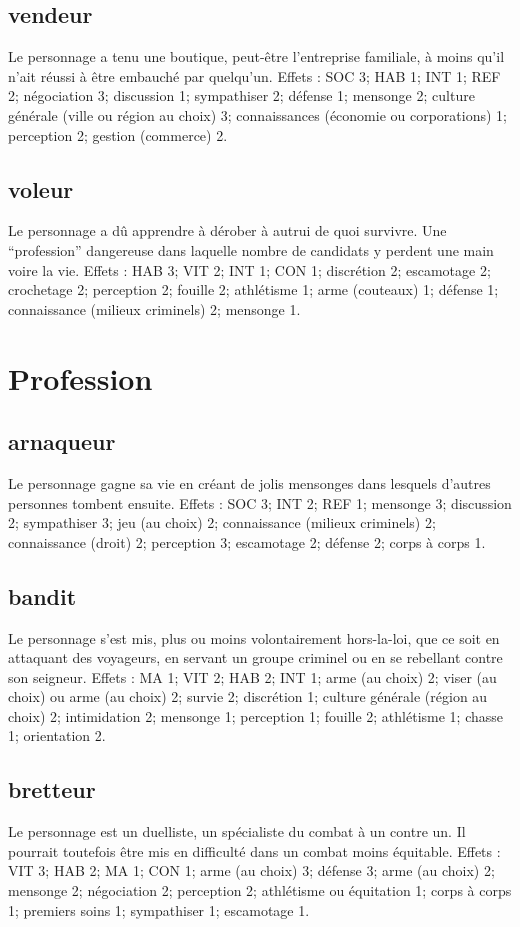 \documentclass[10pt,a4paper,twocolumn]{book}
\begin{document}
\subsection*{vendeur}
Le personnage a tenu une boutique, peut-être l’entreprise familiale, à moins qu’il n’ait réussi à être embauché par quelqu’un.
Effets : SOC 3; HAB 1; INT 1; REF 2; négociation  3; discussion 1; sympathiser 2; défense 1; mensonge 2; culture générale (ville ou région au choix) 3; connaissances (économie ou corporations) 1; perception  2; gestion (commerce) 2.
\subsection*{voleur}
Le personnage a dû apprendre à dérober à autrui de quoi survivre. Une “profession” dangereuse dans laquelle nombre de candidats y perdent une main voire la vie.
Effets : HAB 3; VIT 2; INT 1; CON 1; discrétion 2; escamotage 2; crochetage 2; perception 2; fouille 2; athlétisme 1; arme (couteaux) 1; défense 1; connaissance (milieux criminels) 2; mensonge 1.

\section{Profession}
\subsection*{arnaqueur}
Le personnage gagne sa vie en créant de jolis mensonges dans lesquels d’autres personnes tombent ensuite.
Effets : SOC 3; INT 2; REF 1; mensonge 3; discussion 2; sympathiser 3; jeu (au choix) 2; connaissance (milieux criminels) 2; connaissance (droit) 2; perception 3; escamotage 2; défense 2; corps à corps 1.
\subsection*{bandit}
Le personnage s’est mis, plus ou moins volontairement hors-la-loi, que ce soit en attaquant des voyageurs, en servant un groupe criminel ou en se rebellant contre son seigneur.
Effets : MA 1; VIT 2; HAB 2; INT 1; arme (au choix) 2; viser (au choix) ou arme (au choix) 2; survie 2; discrétion 1; culture générale (région au choix) 2; intimidation 2; mensonge 1; perception 1; fouille 2; athlétisme 1; chasse 1; orientation 2.
\subsection*{bretteur}
Le personnage est un duelliste, un spécialiste du combat à un contre un. Il pourrait toutefois être mis en difficulté dans un combat moins équitable.
Effets : VIT 3; HAB 2; MA 1; CON 1; arme (au choix) 3; défense 3; arme (au choix) 2; mensonge 2; négociation 2; perception 2; athlétisme ou équitation 1; corps à corps 1; premiers soins 1; sympathiser 1; escamotage 1.
\end{document}
